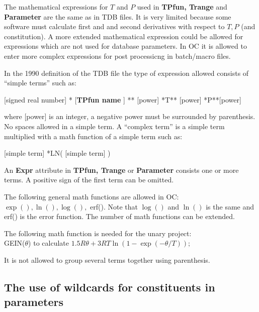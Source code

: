 \documentclass{article}
\begin{document}
The mathematical expressions for $T$ and $P$ used in {\bf TPfun,
  Trange} and {\bf Parameter} are the same as in TDB files.  It is
very limited because some software must calculate first and and second
derivatives with respect to $T, P$ (and constitution).  A more
extended mathematical expression could be allowed for expressions
which are not used for database parameters.  In OC it is allowed to
enter more complex expressions for post processicng in batch/macro
files.

In the 1990 definition of the TDB file the type of expression allowed
consists of ``simple terms'' such as:

[signed real number] * [{\bf TPfun name} ] ** [power] *T** [power] *P**[power]

where [power] is an integer, a negative power must be surrounded by
parenthesis.  No spaces allowed in a simple term.  A ``complex term''
is a simple term multiplied with a math function of a simple term such
as:

[simple term] *LN( [simple term] )

An {\bf Expr} attribute in {\bf TPfun, Trange} or {\bf Parameter}
consists one or more terms.  A positive sign of the first term can be
omitted.
  
The following general math functions are allowed in OC:\\ $\exp(),
\ln(), \log(),$ erf().  Note that $\log()$ and $\ln()$ is the same and
erf() is the error function.  The number of math functions can be
extended.

The following math function is needed for the unary
project:\\ GEIN($\theta$) to calculate
$1.5R\theta+3RT\ln(1-\exp(-\theta/T));$

It is not allowed to group several terms together using parenthesis.

\subsection{The use of wildcards for constituents in parameters}\label{sec:wildcard}
\end{document}
